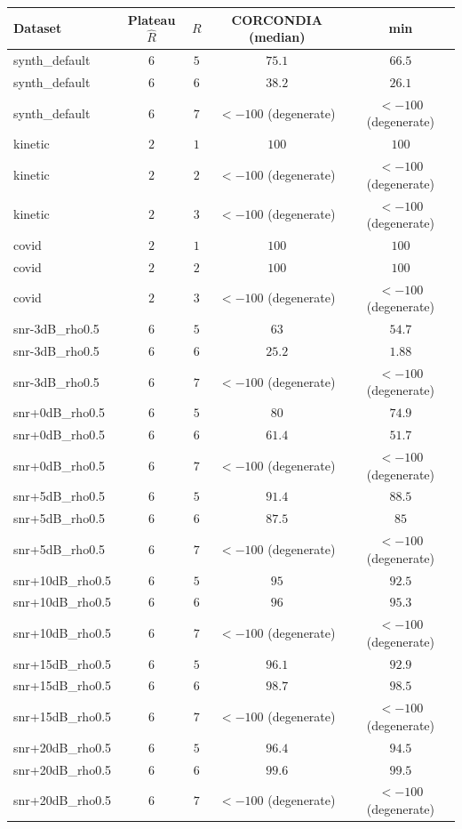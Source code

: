 \begin{longtable}{@{}lcccc@{}}
\toprule
Dataset & Plateau \(\hat R\) & \(R\) & CORCONDIA (median) & min \\
\midrule
\endhead
synth\_default & \(6\) & \(5\) & \(75.1\) & \(66.5\) \\
synth\_default & \(6\) & \(6\) & \(38.2\) & \(26.1\) \\
synth\_default & \(6\) & \(7\) & \(<-100\) (degenerate) & \(<-100\) (degenerate) \\
kinetic & \(2\) & \(1\) & \(100\) & \(100\) \\
kinetic & \(2\) & \(2\) & \(<-100\) (degenerate) & \(<-100\) (degenerate) \\
kinetic & \(2\) & \(3\) & \(<-100\) (degenerate) & \(<-100\) (degenerate) \\
covid & \(2\) & \(1\) & \(100\) & \(100\) \\
covid & \(2\) & \(2\) & \(100\) & \(100\) \\
covid & \(2\) & \(3\) & \(<-100\) (degenerate) & \(<-100\) (degenerate) \\
snr-3dB\_rho0.5 & \(6\) & \(5\) & \(63\) & \(54.7\) \\
snr-3dB\_rho0.5 & \(6\) & \(6\) & \(25.2\) & \(1.88\) \\
snr-3dB\_rho0.5 & \(6\) & \(7\) & \(<-100\) (degenerate) & \(<-100\) (degenerate) \\
snr+0dB\_rho0.5 & \(6\) & \(5\) & \(80\) & \(74.9\) \\
snr+0dB\_rho0.5 & \(6\) & \(6\) & \(61.4\) & \(51.7\) \\
snr+0dB\_rho0.5 & \(6\) & \(7\) & \(<-100\) (degenerate) & \(<-100\) (degenerate) \\
snr+5dB\_rho0.5 & \(6\) & \(5\) & \(91.4\) & \(88.5\) \\
snr+5dB\_rho0.5 & \(6\) & \(6\) & \(87.5\) & \(85\) \\
snr+5dB\_rho0.5 & \(6\) & \(7\) & \(<-100\) (degenerate) & \(<-100\) (degenerate) \\
snr+10dB\_rho0.5 & \(6\) & \(5\) & \(95\) & \(92.5\) \\
snr+10dB\_rho0.5 & \(6\) & \(6\) & \(96\) & \(95.3\) \\
snr+10dB\_rho0.5 & \(6\) & \(7\) & \(<-100\) (degenerate) & \(<-100\) (degenerate) \\
snr+15dB\_rho0.5 & \(6\) & \(5\) & \(96.1\) & \(92.9\) \\
snr+15dB\_rho0.5 & \(6\) & \(6\) & \(98.7\) & \(98.5\) \\
snr+15dB\_rho0.5 & \(6\) & \(7\) & \(<-100\) (degenerate) & \(<-100\) (degenerate) \\
snr+20dB\_rho0.5 & \(6\) & \(5\) & \(96.4\) & \(94.5\) \\
snr+20dB\_rho0.5 & \(6\) & \(6\) & \(99.6\) & \(99.5\) \\
snr+20dB\_rho0.5 & \(6\) & \(7\) & \(<-100\) (degenerate) & \(<-100\) (degenerate) \\
\bottomrule
\end{longtable}
